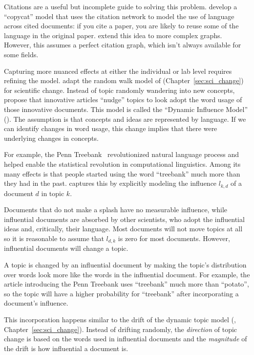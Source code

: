 Citations are a useful but incomplete guide to solving this problem.
\citet{dietz-07} develop a ``copycat'' model that uses the citation
network to model the use of language across cited documents: if you
cite a paper, you are likely to reuse some of the language in the
original paper.
\citet{he-09} extend this idea to more complex graphs.
However, this assumes a perfect citation graph, which isn't always
available for some fields.  

Capturing more nuanced effects at either the individual or lab level requires
refining the model.  \citet{gerrish-10} adapt the random walk model of
\citet{wang-08} (Chapter~\ref{sec:sci_change}) for scientific change.  Instead of topic randomly wandering into
new concepts, \citet{gerrish-10} propose that innovative articles ``nudge'' topics
to look adopt the word usage of those innovative documents.  This model is called the ``Dynamic
Influence Model'' (). The assumption is that concepts and ideas are represented
by language. If we can identify changes in word usage, this change implies that there
were underlying changes in concepts.

For example, the Penn Treebank~\citep{marcus-93} revolutionized natural language
process and helped enable the statistical revolution in computational
linguistics.  Among its many effects is that people started using the word
``treebank'' much more than they had in the past.   captures this by
explicitly modeling the influence $l_{k,d}$ of a document $d$ in topic
$k$.

Documents that do not make a splash have no measurable influence, while influential
documents are absorbed by other scientists, who adopt the influential ideas and, critically, their language.  Most documents will not move topics
at all so it is reasonable to assume that $l_{d,k}$ is zero for most
documents.  However, influential documents will change a topic.

A topic is changed by an influential document by making the topic's
distribution over words look more like the words in the influential document.  For example, the article
introducing the Penn Treebank uses ``treebank'' much more than
``potato'', so the topic will have a higher probability for
``treebank'' after incorporating a document's influence.

This incorporation happens similar to the drift of the dynamic topic
model (, Chapter~\ref{sec:sci_change}).  Instead of drifting
randomly, the \emph{direction} of topic change is based on the words
used in influential documents and the \emph{magnitude} of the drift is
how influential a document is.

